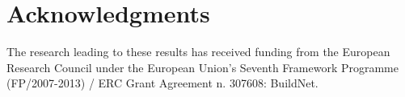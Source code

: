 \documentclass[envcountsect]{svjour3}
\begin{document}
\section*{Acknowledgments}
The research leading to these results has received funding from the European Research Council under the European Union's Seventh Framework Programme (FP/2007-2013) / ERC Grant Agreement n. 307608: BuildNet.



















































































\appendix  %

\end{document}
